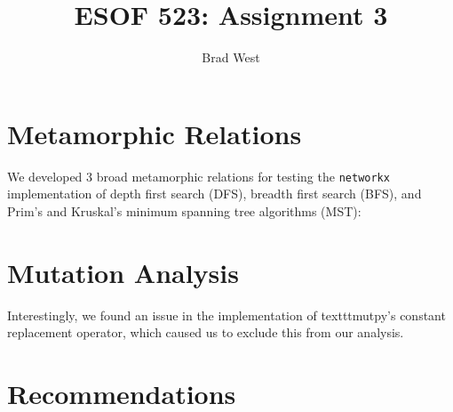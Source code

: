 \documentclass[12pt]{article}
\begin{document}
\title{ESOF 523: Assignment 3}
\author{Brad West}
\date{}
\maketitle

\section{Metamorphic Relations}

We developed 3 broad metamorphic relations for testing the \texttt{networkx} implementation of depth first search (DFS), breadth first search (BFS), and Prim's and Kruskal's minimum spanning tree algorithms (MST):



\section{Mutation Analysis}

Interestingly, we found an issue in the implementation of texttt{mutpy}'s constant replacement operator, which caused us to exclude this from our analysis.

\section{Recommendations}
\end{document}
